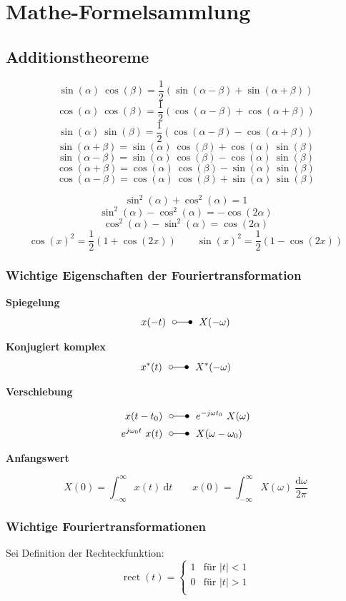 \documentclass[a4paper, 11pt]{article}
\newcommand{\fancyformula}[2]{
        \small
        \raggedright{\sffamily\textbf{#1}}
        #2
}
\newcommand{\ftransform}{~~\laplace~~}
\DeclareMathOperator{\rect}{rect}
\begin{document}
\section*{Mathe-Formelsammlung}
\subsection*{Additionstheoreme}
\begin{multicols}{2}
\[ \sin(\alpha) ~ \cos(\beta) = \frac{1}{2} (\sin(\alpha - \beta) + \sin(\alpha + \beta)) \]
\[ \cos(\alpha) ~ \cos(\beta) = \frac{1}{2} (\cos(\alpha - \beta) + \cos(\alpha + \beta)) \]
\[ \sin(\alpha) ~ \sin(\beta) = \frac{1}{2} (\cos(\alpha - \beta) - \cos(\alpha + \beta)) \]
\vspace{0.5pt}
\[ \sin(\alpha + \beta) = \sin(\alpha) ~ \cos(\beta) + \cos(\alpha) ~ \sin(\beta) \]
\[ \sin(\alpha - \beta) = \sin(\alpha) ~ \cos(\beta) - \cos(\alpha) ~ \sin(\beta) \]
\[ \cos(\alpha + \beta) = \cos(\alpha) ~ \cos(\beta) - \sin(\alpha) ~ \sin(\beta) \]
\[ \cos(\alpha - \beta) = \cos(\alpha) ~ \cos(\beta) + \sin(\alpha) ~ \sin(\beta) \]
\end{multicols}
\vspace{0.5pt}
\[ \sin^2(\alpha) + \cos^2(\alpha) = 1 \]
\[ \sin^2(\alpha) - \cos^2(\alpha) = -\cos(2\alpha) \]
\[ \cos^2(\alpha) - \sin^2(\alpha) = \cos(2\alpha) \]
\[ \cos(x)^2 = \frac{1}{2} \left(1 + \cos(2x) \right) \qquad \sin(x)^2 = \frac{1}{2} \left(1 - \cos(2x) \right) \]

\subsubsection*{Wichtige Eigenschaften der Fouriertransformation}
\begin{multicols}{2}
	\fancyformula{Spiegelung}{\[ x(-t) \ftransform X(-\omega) \]}
	\fancyformula{Konjugiert komplex}{\[ x^*(t) \ftransform X^*(-\omega)\]}
	\fancyformula{Verschiebung}{
		\begin{align*}
			x(t - t_0) & \ftransform e^{-j \omega t_0} ~ X(\omega) \\
			e^{j \omega_0 t} ~ x(t) & \ftransform X(\omega - \omega_0)
		\end{align*}
	}	
	\fancyformula{Anfangswert}{
		\[ X(0) = \int_{-\infty}^{\infty} x(t) ~ \mathrm dt \qquad x(0) = \int_{-\infty}^{\infty} X(\omega) ~ \frac{\mathrm d\omega}{2 \pi} \]	
	}
\end{multicols}


\subsubsection*{Wichtige Fouriertransformationen}
Sei Definition der Rechteckfunktion:
\[
	\rect(t) = \begin{cases}
		1 & \text{für } |t| < 1\\
		0 & \text{für } |t| > 1\\
	\end{cases}
\]
\end{document}
